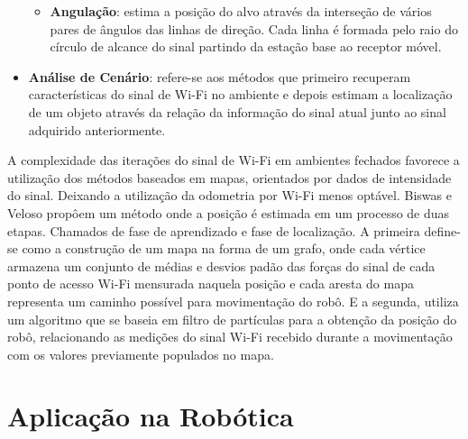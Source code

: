 \begin{itemize}
\begin{itemize}
        \item \textbf{Angulação}: estima a posição do alvo através da interseção de vários pares de
        ângulos das linhas de direção. Cada linha é formada pelo raio do círculo de alcance
        do sinal partindo da estação base ao receptor móvel.

    \end{itemize}

    \item \textbf{Análise de Cenário}: refere-se aos métodos que primeiro recuperam características do sinal de Wi-Fi no ambiente e depois estimam a localização de um objeto através da relação da informação do sinal atual junto ao sinal adquirido anteriormente. 

\end{itemize}

A complexidade das iterações do sinal de Wi-Fi em ambientes fechados favorece a utilização dos métodos baseados em mapas, orientados por dados de intensidade do sinal.
Deixando a utilização da odometria por Wi-Fi menos optável. Biswas e Veloso propôem um método onde a posição é estimada em um processo de duas etapas. Chamados de fase de aprendizado e fase de localização.
A primeira define-se como a construção de um mapa na forma de um grafo, onde cada vértice armazena um conjunto de médias e desvios padão das forças do sinal de cada ponto de acesso Wi-Fi mensurada naquela posição e cada aresta do mapa representa um caminho possível para movimentação do robô.
E a segunda, utiliza um algoritmo que se baseia em filtro de partículas para a obtenção da posição do robô, relacionando as medições do sinal Wi-Fi recebido durante a movimentação com os valores previamente populados no mapa.\cite{Biswas2010}

\section{Aplicação na Robótica}
\label{sec:ass1}
\lipsum[1]


